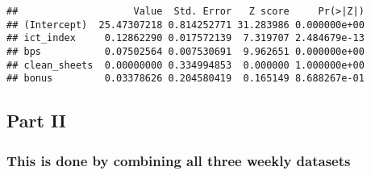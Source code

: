 \documentclass[]{article}
\newenvironment{Shaded}{\begin{snugshade}}{\end{snugshade}}
\newcommand{\DataTypeTok}[1]{\textcolor[rgb]{0.13,0.29,0.53}{#1}}
\newcommand{\DecValTok}[1]{\textcolor[rgb]{0.00,0.00,0.81}{#1}}
\newcommand{\FloatTok}[1]{\textcolor[rgb]{0.00,0.00,0.81}{#1}}
\newcommand{\KeywordTok}[1]{\textcolor[rgb]{0.13,0.29,0.53}{\textbf{#1}}}
\newcommand{\NormalTok}[1]{#1}
\newcommand{\OperatorTok}[1]{\textcolor[rgb]{0.81,0.36,0.00}{\textbf{#1}}}
\newcommand{\OtherTok}[1]{\textcolor[rgb]{0.56,0.35,0.01}{#1}}
\newcommand{\StringTok}[1]{\textcolor[rgb]{0.31,0.60,0.02}{#1}}
\begin{document}
\begin{verbatim}
##                    Value  Std. Error   Z score     Pr(>|Z|)
## (Intercept)  25.47307218 0.814252771 31.283986 0.000000e+00
## ict_index     0.12862290 0.017572139  7.319707 2.484679e-13
## bps           0.07502564 0.007530691  9.962651 0.000000e+00
## clean_sheets  0.00000000 0.334994853  0.000000 1.000000e+00
## bonus         0.03378626 0.204580419  0.165149 8.688267e-01
\end{verbatim}

\hypertarget{part-ii}{%
\subsection{Part II}\label{part-ii}}

\hypertarget{this-is-done-by-combining-all-three-weekly-datasets}{%
\subsubsection{This is done by combining all three weekly
datasets}\label{this-is-done-by-combining-all-three-weekly-datasets}}

\begin{Shaded}
\end{Shaded}
\end{document}
